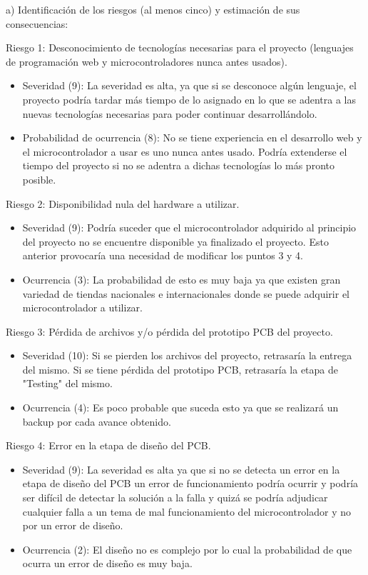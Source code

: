 \documentclass[
11pt, %
]{charter}
\begin{document}
a) Identificación de los riesgos (al menos cinco) y estimación de sus consecuencias:
 
Riesgo 1: Desconocimiento de tecnologías necesarias para el proyecto (lenguajes de programación web y microcontroladores nunca antes usados).
\begin{itemize}
	\item Severidad (9):
	La severidad es alta, ya que si se desconoce algún lenguaje, el proyecto podría tardar más tiempo de lo asignado en lo que se adentra a las nuevas tecnologías necesarias para poder continuar desarrollándolo.
	\item Probabilidad de ocurrencia (8):
	No se tiene experiencia en el desarrollo web y el microcontrolador a usar es uno nunca antes usado. Podría extenderse el tiempo del proyecto si no se adentra a dichas tecnologías lo más pronto posible.
\end{itemize}   

Riesgo 2: Disponibilidad nula del hardware a utilizar.
\begin{itemize}
	\item Severidad (9):
	Podría suceder que el microcontrolador adquirido al principio del proyecto no se encuentre disponible ya finalizado el proyecto. Esto anterior provocaría una necesidad de modificar los puntos 3 y 4.
	\item Ocurrencia (3):
	La probabilidad de esto es muy baja ya que existen gran variedad de tiendas nacionales e internacionales donde se puede adquirir el microcontrolador a utilizar.
\end{itemize}

Riesgo 3: Pérdida de archivos y/o pérdida del prototipo PCB del proyecto.
\begin{itemize}
	\item Severidad (10):
	Si se pierden los archivos del proyecto, retrasaría la entrega del mismo. Si se tiene pérdida del prototipo PCB, retrasaría la etapa de "Testing" del mismo.
	\item Ocurrencia (4):
	Es poco probable que suceda esto ya que se realizará un backup por cada avance obtenido.
\end{itemize}

Riesgo 4: Error en la etapa de diseño del PCB.
\begin{itemize}
	\item Severidad (9):
	La severidad es alta ya que si no se detecta un error en la etapa de diseño del PCB un error de funcionamiento podría ocurrir y podría ser difícil de detectar la solución a la falla y quizá se podría adjudicar cualquier falla a un tema de mal funcionamiento del microcontrolador y no por un error de diseño.

	\item Ocurrencia (2):
	El diseño no es complejo por lo cual la probabilidad de que ocurra un error de diseño es muy baja.

\end{itemize}
\end{document}
